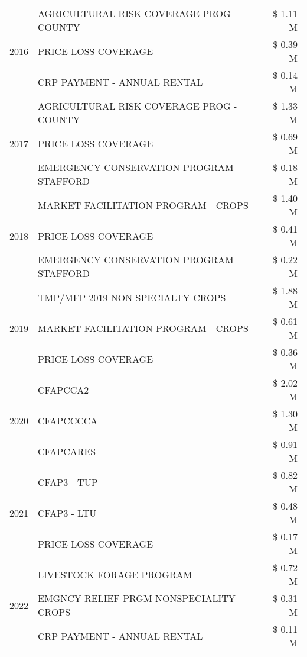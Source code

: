 \begin{tabular}{llr}
\cline{1-3}
\multirow[t]{3}{*}{2016} & AGRICULTURAL RISK COVERAGE PROG - COUNTY & \$ 1.11 M \\
 & PRICE LOSS COVERAGE & \$ 0.39 M \\
 & CRP PAYMENT - ANNUAL RENTAL & \$ 0.14 M \\
\cline{1-3}
\multirow[t]{3}{*}{2017} & AGRICULTURAL RISK COVERAGE PROG - COUNTY & \$ 1.33 M \\
 & PRICE LOSS COVERAGE & \$ 0.69 M \\
 & EMERGENCY CONSERVATION PROGRAM STAFFORD & \$ 0.18 M \\
\cline{1-3}
\multirow[t]{3}{*}{2018} & MARKET FACILITATION PROGRAM - CROPS & \$ 1.40 M \\
 & PRICE LOSS COVERAGE & \$ 0.41 M \\
 & EMERGENCY CONSERVATION PROGRAM STAFFORD & \$ 0.22 M \\
\cline{1-3}
\multirow[t]{3}{*}{2019} & TMP/MFP 2019 NON SPECIALTY CROPS & \$ 1.88 M \\
 & MARKET FACILITATION PROGRAM - CROPS & \$ 0.61 M \\
 & PRICE LOSS COVERAGE & \$ 0.36 M \\
\cline{1-3}
\multirow[t]{3}{*}{2020} & CFAPCCA2 & \$ 2.02 M \\
 & CFAPCCCCA & \$ 1.30 M \\
 & CFAPCARES & \$ 0.91 M \\
\cline{1-3}
\multirow[t]{3}{*}{2021} & CFAP3 - TUP & \$ 0.82 M \\
 & CFAP3 - LTU & \$ 0.48 M \\
 & PRICE LOSS COVERAGE & \$ 0.17 M \\
\cline{1-3}
\multirow[t]{3}{*}{2022} & LIVESTOCK FORAGE PROGRAM & \$ 0.72 M \\
 & EMGNCY RELIEF PRGM-NONSPECIALITY CROPS & \$ 0.31 M \\
 & CRP PAYMENT - ANNUAL RENTAL & \$ 0.11 M \\
\cline{1-3}
\bottomrule
\end{tabular}
